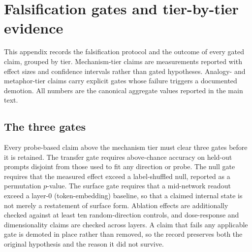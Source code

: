 
\renewcommand{\thesection}{Appendix~\Alph{section}}
\renewcommand{\thesubsection}{Appendix~\Alph{section}.\arabic{subsection}}

\section{Falsification gates and tier-by-tier evidence}
\label{app:gates}

This appendix records the falsification protocol and the outcome of every gated
claim, grouped by tier. Mechanism-tier claims are measurements reported with effect
sizes and confidence intervals rather than gated hypotheses. Analogy- and
metaphor-tier claims carry explicit gates whose failure triggers a documented
demotion. All numbers are the canonical aggregate values reported in the main text.

\subsection{The three gates}
Every probe-based claim above the mechanism tier must clear three gates before it is
retained. The transfer gate requires above-chance accuracy on held-out prompts
disjoint from those used to fit any direction or probe. The null gate requires
that the measured effect exceed a label-shuffled null, reported as a permutation
$p$-value. The surface gate requires that a mid-network readout exceed a
layer-0 (token-embedding) baseline, so that a claimed internal state is not merely a
restatement of surface form. Ablation effects are additionally checked against at
least ten random-direction controls, and dose-response and dimensionality claims are
checked across layers. A claim that fails any applicable gate is demoted in place
rather than removed, so the record preserves both the original hypothesis and the
reason it did not survive.

